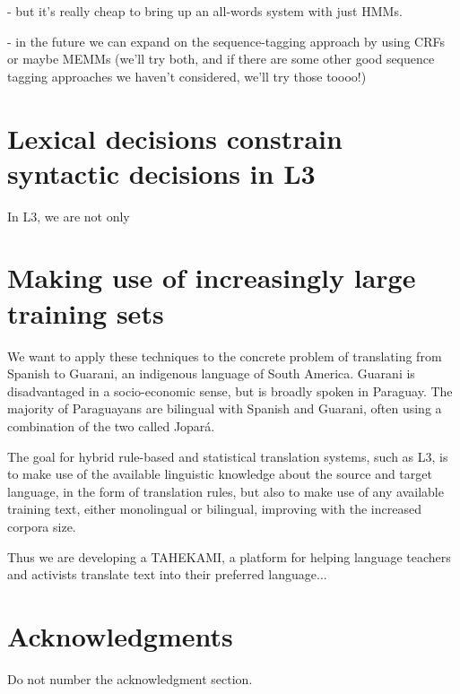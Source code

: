 \documentclass{article}
\begin{document}
- but it's really cheap to bring up an all-words system with just HMMs.

- in the future we can expand on the sequence-tagging approach by using CRFs or
  maybe MEMMs (we'll try both, and if there are some other good sequence
  tagging approaches we haven't considered, we'll try those toooo!)

\section{Lexical decisions constrain syntactic decisions in L3}
In L3, we are not only 

\section{Making use of increasingly large training sets}

We want to apply these techniques to the concrete problem of translating from
Spanish to Guarani, an indigenous language of South America. Guarani is
disadvantaged in a socio-economic sense, but is broadly spoken in Paraguay. The
majority of Paraguayans are bilingual with Spanish and Guarani, often using a
combination of the two called Jopar{\'a}.

The goal for hybrid rule-based and statistical translation systems, such as L3,
is to make use of the available linguistic knowledge about the source and
target language, in the form of translation rules, but also to make use of any
available training text, either monolingual or bilingual, improving with the
increased corpora size.

Thus we are developing a TAHEKAMI, a platform for helping language teachers and
activists translate text into their preferred language...

\section*{Acknowledgments}

Do not number the acknowledgment section.


{}
\end{document}
